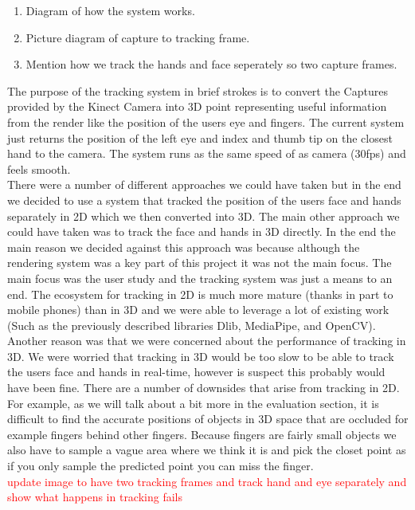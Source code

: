\begin{enumerate}[itemsep=-0.25em]
	\item Diagram of how the system works.
	\item Picture diagram of capture to tracking frame.
	\item Mention how we track the hands and face seperately so two capture frames.  
\end{enumerate}

The purpose of the tracking system in brief strokes is to convert the Captures provided by the Kinect Camera into 3D point representing useful information from the render like the position of the users eye and fingers. The current system just returns the position of the left eye and index and thumb tip on the closest hand to the camera. The system runs as the same speed of as camera (30fps) and feels smooth. \\

There were a number of different approaches we could have taken but in the end we decided to use a system that tracked the position of the users face and hands separately in 2D which we then converted into 3D. The main other approach we could have taken was to track the face and hands in 3D directly. In the end the main reason we decided against this approach was because although the rendering system was a key part of this project it was not the main focus. The main focus was the user study and the tracking system was just a means to an end. The ecosystem for tracking in 2D is much more mature (thanks in part to mobile phones) than in 3D and we were able to leverage a lot of existing work (Such as the previously described libraries Dlib, MediaPipe, and OpenCV). Another reason was that we were concerned about the performance of tracking in 3D. We were worried that tracking in 3D would be too slow to be able to track the users face and hands in real-time, however is suspect this probably would have been fine. There are a number of downsides that arise from tracking in 2D. For example, as we will talk about a bit more in the evaluation section, it is difficult to find the accurate positions of objects in 3D space that are occluded for example fingers behind other fingers. Because fingers are fairly small objects we also have to sample a vague area where we think it is and pick the closet point as if you only sample the predicted point you can miss the finger.\\

\textcolor{red}{update image to have two tracking frames and track hand and eye separately and show what happens in tracking fails}

